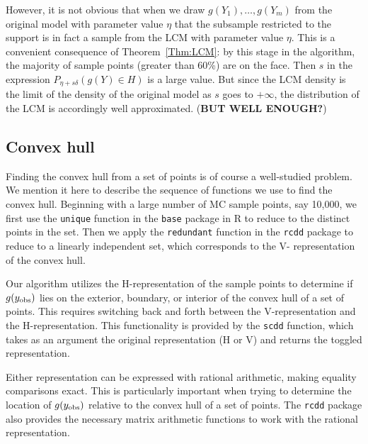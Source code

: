 However, it is not obvious that when we draw $g(Y_1), \ldots, g(Y_m)$ from the 
original model with parameter value $\eta$ that the subsample restricted to the 
support is in fact a sample from the LCM with parameter value $\eta$.  This is a 
convenient consequence of Theorem~\ref{Thm:LCM}: by this stage in the algorithm, the 
majority of sample points (greater than 60\%) are on the face.  Then $s$ in the 
expression $P_{\eta + s \delta}(g(Y) \in H)$ is a large value.  But since the LCM 
density is the limit of the density of the original model as $s$ goes to $+\infty$, 
the distribution of the LCM is accordingly well approximated.  (\textbf{BUT WELL 
ENOUGH?})


\subsection{Convex hull}
Finding the convex hull from a set of points is of course a well-studied problem.  We 
mention it here to describe the sequence of functions we use to find the convex hull.  
Beginning with a large number of MC sample points, say 10,000, we first use the 
\texttt{unique} function in the \texttt{base} package in R to reduce to the distinct 
points in the set.  Then we apply the \texttt{redundant} function in the \texttt{rcdd} 
package to reduce to a linearly independent set, which corresponds to the V-
representation of the convex hull.

Our algorithm utilizes the H-representation of the sample points to determine if $g(y_{\textrm{obs}})$ lies on the 
exterior, boundary, or interior of the convex hull of a set of points.  
This requires switching back and forth between the V-representation and 
the H-representation.  
This functionality is provided by the \texttt{scdd} function, which takes as an 
argument the original representation (H or V) and returns the toggled representation.

Either representation can be expressed with rational arithmetic, making equality 
comparisons exact.  This is particularly important when trying to determine the 
location of $g(y_{\textrm{obs}})$ relative to the convex hull of a set of points.  The \texttt
{rcdd} package also provides the necessary matrix arithmetic functions to work with 
the rational representation.
